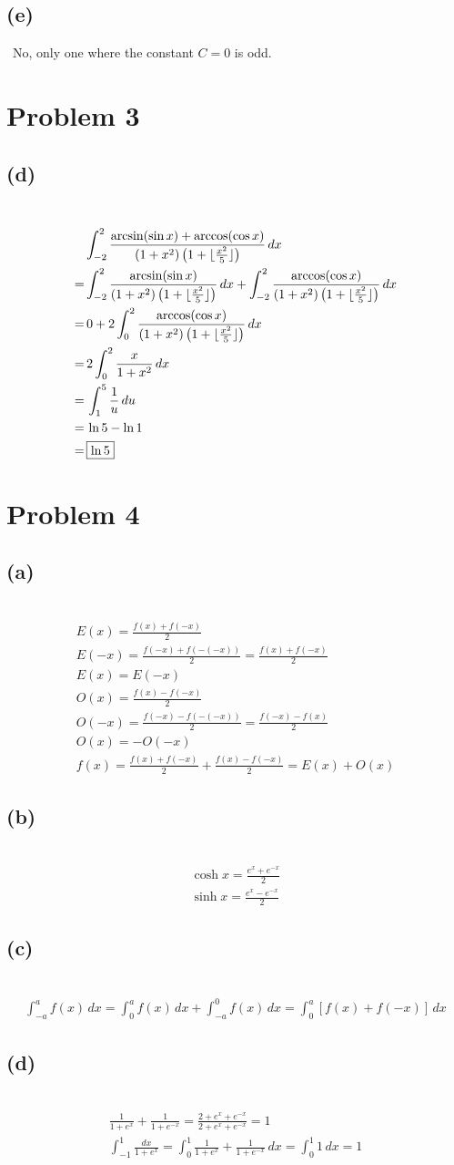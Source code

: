 \documentclass[12pt]{article}
\newcommand*{\paren}[1]{\ensuremath\left(#1\right)}
\newcommand{\floor}[1]{\lfloor #1 \rfloor}
\newcommand{\problem}[1]{\section{Problem #1}}
\newcommand{\subproblem}[1]{\subsection{(#1)} \,}
\begin{document}
\subproblem{e}
No, only one where the constant $C=0$ is odd.

\problem{3}

\subproblem{d}
\begin{align*}
    &\int_{-2}^2 \frac{\arcsin (\sin x)+\arccos (\cos x)}{(1+x^2)\paren{1+\floor{\frac{x^2}{5}}}}\, dx\\
    =&\int_{-2}^2 \frac{\arcsin (\sin x)}{(1+x^2)\paren{1+\floor{\frac{x^2}{5}}}}\, dx + \int_{-2}^2 \frac{\arccos (\cos x)}{(1+x^2)\paren{1+\floor{\frac{x^2}{5}}}}\, dx\\
    =& \, 0+ 2 \int_0^2 \frac{\arccos (\cos x)}{(1+x^2)\paren{1+\floor{\frac{x^2}{5}}}}\, dx\\
    =&\, 2 \int_0^2 \frac{x}{1+x^2} \, dx\\
    = &\, \int_1^5 \frac{1}{u} \, du\\
    =&\, \ln 5 - \ln 1\\
    =&\,\boxed{\ln 5}
\end{align*}

\problem{4}

\subproblem{a}
\begin{gather*}
    E(x)=\frac{f(x)+f(-x)}{2}\\
    E(-x)=\frac{f(-x)+f(-(-x))}{2}=\frac{f(x)+f(-x)}{2}\\
    \boxed{E(x)=E(-x)}\\
    O(x)=\frac{f(x)-f(-x)}{2}\\
    O(-x)=\frac{f(-x)-f(-(-x))}{2}=\frac{f(-x)-f(x)}{2}\\
    \boxed{O(x)=-O(-x)}\\
    f(x)=\frac{f(x)+f(-x)}{2}+\frac{f(x)-f(-x)}{2}=E(x)+O(x)
\end{gather*}

\subproblem{b}
\begin{gather*}
    \cosh x=\frac{e^x+e^{-x}}{2}\\
    \sinh x=\frac{e^x-e^{-x}}{2}
\end{gather*}

\subproblem{c}
\begin{gather*}
    \int_{-a}^af(x)\, dx=\int_0^af(x)\, dx+\int_{-a}^0 f(x)\, dx=\int_0^a[f(x)+f(-x)]\, dx
\end{gather*}

\subproblem{d}
\begin{gather*}
    \frac{1}{1+e^x}+\frac{1}{1+e^{-x}}=\frac{2+e^x+e^{-x}}{2+e^x+e^{-x}}=1\\
    \int_{-1}^1\frac{dx}{1+e^x} = \int_0^1 \frac{1}{1+e^x}+\frac{1}{1+e^{-x}}\, dx= \int_0^1 1\, dx=\boxed{1}
\end{gather*}
\end{document}
